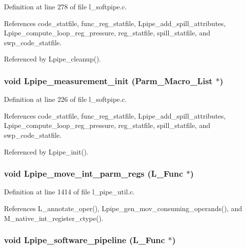 Definition at line 278 of file l\_\-softpipe.c.

References code\_\-statfile, func\_\-reg\_\-statfile, Lpipe\_\-add\_\-spill\_\-attributes, Lpipe\_\-compute\_\-loop\_\-reg\_\-pressure, reg\_\-statfile, spill\_\-statfile, and swp\_\-code\_\-statfile.

Referenced by Lpipe\_\-cleanup().
\subsubsection{\setlength{\rightskip}{0pt plus 5cm}void Lpipe\_\-measurement\_\-init (Parm\_\-Macro\_\-List $\ast$)}\label{l__softpipe_8h_6b73cb449fa2281895b3a4aa9d030b76}




Definition at line 226 of file l\_\-softpipe.c.

References code\_\-statfile, func\_\-reg\_\-statfile, Lpipe\_\-add\_\-spill\_\-attributes, Lpipe\_\-compute\_\-loop\_\-reg\_\-pressure, reg\_\-statfile, spill\_\-statfile, and swp\_\-code\_\-statfile.

Referenced by Lpipe\_\-init().
\subsubsection{\setlength{\rightskip}{0pt plus 5cm}void Lpipe\_\-move\_\-int\_\-parm\_\-regs (L\_\-Func $\ast$)}\label{l__softpipe_8h_bc532cb244121a0e4179f7d989a94f9e}




Definition at line 1414 of file l\_\-pipe\_\-util.c.

References L\_\-annotate\_\-oper(), Lpipe\_\-gen\_\-mov\_\-consuming\_\-operands(), and M\_\-native\_\-int\_\-register\_\-ctype().
\subsubsection{\setlength{\rightskip}{0pt plus 5cm}void Lpipe\_\-software\_\-pipeline (L\_\-Func $\ast$)}\label{l__softpipe_8h_462160b7baa0babe71d4d99a2ea1cacf}




